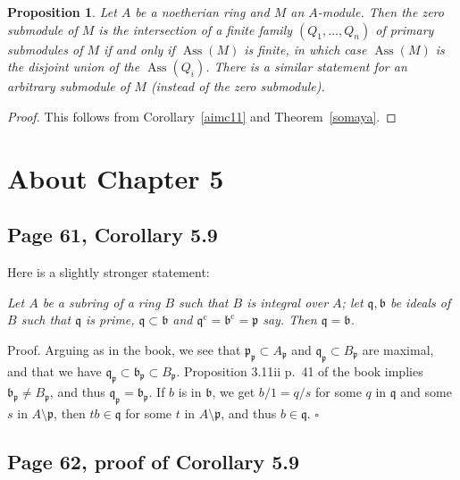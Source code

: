 \documentclass[parskip=half,fontsize=12pt]{scrartcl}%
\newcommand{\oo}{\operatorname}\newcommand{\ooo}{\operatorname*}
\newcommand{\mf}{\mathfrak}
\newcommand{\bbb}{\mf b}
\newcommand{\ppp}{\mf p}
\newcommand{\qqq}{\mf q}
\newcommand{\Ass}{\oo{Ass}}
\newtheorem{prop}[thm]{Proposition}
\begin{document}
\begin{prop}%
Let $A$ be a noetherian ring and $M$ an $A$-module. Then the zero submodule of $M$ is the intersection of a finite family $(Q_1,\dots,Q_n)$ of primary submodules  of $M$ if and only if $\Ass(M)$ is finite, in which case $\Ass(M)$ is the disjoint union of the $\Ass(Q_i)$. There is a similar statement for an arbitrary submodule of $M$ (instead of the zero submodule).%
\end{prop}
\begin{proof}
This follows from Corollary~\ref{aimc11} and Theorem~\ref{somaya}.
\end{proof}

\section{About Chapter 5}%

\subsection{Page 61, Corollary 5.9}\label{59}%

Here is a slightly stronger statement: 

\emph{Let $A$ be a subring of a ring $B$ such that $B$ is integral over $A$; let $\qqq,\bbb$ be ideals of $B$ such that $\qqq$ is prime, $\qqq\subset\bbb$ and $\qqq^{\oo c}=\bbb^{\oo c}=\ppp$ say. Then $\qqq=\bbb$.}

Proof. Arguing as in the book, we see that $\ppp_\ppp\subset A_\ppp$ and $\qqq_\ppp\subset B_\ppp$ are maximal, and that we have $\qqq_\ppp\subset\bbb_\ppp\subset B_\ppp$. Proposition 3.11ii p.~41 of the book implies $\bbb_\ppp\ne B_\ppp$, and thus $\qqq_\ppp=\bbb_\ppp$. If $b$ is in $\bbb$, we get $b/1=q/s$ for some $q$ in $\qqq$ and some $s$ in $A\setminus\ppp$, then $tb\in\qqq$ for some $t$ in $A\setminus\ppp$, and thus $b\in\qqq$. $\square$

\subsection{Page 62, proof of Corollary 5.9}%
\end{document}
